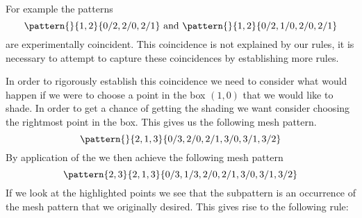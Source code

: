 For example the patterns
\begin{equation*}
    \pattern{}{1,2}{0/2,2/0,2/1} \text{ and } \pattern{}{1,2}{0/2,1/0,2/0,2/1}
\end{equation*}
are experimentally coincident. This coincidence is not explained by our rules,
it is necessary to attempt to capture these coincidences by establishing more
rules.

In order to rigorously establish this coincidence we need to consider what would
happen if we were to choose a point in the box \((1,0)\) that we would like to shade.
In order to get a chance of getting the shading we want consider choosing the
rightmost point in the box.
This gives us the following mesh pattern.
\begin{equation*}
    \pattern{}{2,1,3}{0/3,2/0,2/1,3/0,3/1,3/2}
\end{equation*}
By application of the  we then achieve the following
mesh pattern
\begin{equation*}
    \pattern{2,3}{2,1,3}{0/3,1/3,2/0,2/1,3/0,3/1,3/2}
\end{equation*}
If we look at the highlighted points we see that the subpattern is an occurrence
of the mesh pattern that we originally desired. This gives rise to the following
rule:

